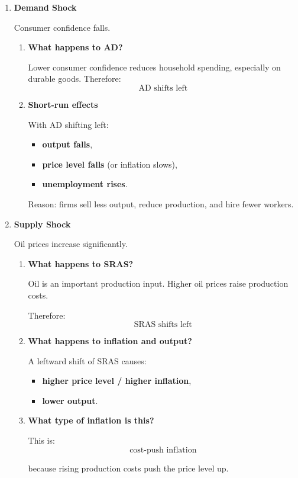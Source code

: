 \documentclass[12pt]{article}
\begin{document}
\begin{enumerate}[label=\textbf{\arabic*.}, start=15]

\item \textbf{Demand Shock}

Consumer confidence falls.

\begin{enumerate}
    \item[(a)] \textbf{What happens to AD?}

Lower consumer confidence reduces household spending, especially on durable goods. Therefore:
\[
\boxed{\text{AD shifts left}}
\]

\item[(b)] \textbf{Short-run effects}

With AD shifting left:
\begin{itemize}
    \item \textbf{output falls},
    \item \textbf{price level falls} (or inflation slows),
    \item \textbf{unemployment rises}.
\end{itemize}

Reason: firms sell less output, reduce production, and hire fewer workers.
\end{enumerate}

\newpage

\item \textbf{Supply Shock}

Oil prices increase significantly.

\begin{enumerate}
    \item[(a)] \textbf{What happens to SRAS?}

Oil is an important production input. Higher oil prices raise production costs.

Therefore:
\[
\boxed{\text{SRAS shifts left}}
\]

\item[(b)] \textbf{What happens to inflation and output?}

A leftward shift of SRAS causes:
\begin{itemize}
    \item \textbf{higher price level / higher inflation},
    \item \textbf{lower output}.
\end{itemize}

\item[(c)] \textbf{What type of inflation is this?}

This is:
\[
\boxed{\text{cost-push inflation}}
\]

because rising production costs push the price level up.
\end{enumerate}

\end{enumerate}
\end{document}
